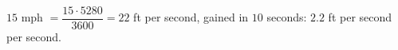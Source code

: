 $15$ mph $=\dfrac{15\cdot5280}{3600}=22$ ft per second, gained in $10$ seconds: $\boxed{2.2}$ ft per second per second.
